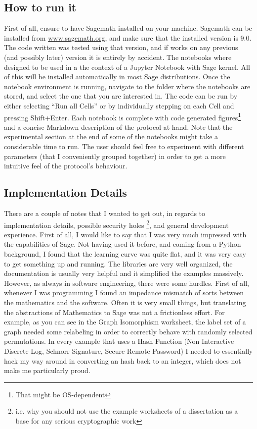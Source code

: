 \documentclass{article}
\begin{document}
\subsection{How to run it}
First of all, ensure to have Sagemath installed on your machine.
Sagemath can be installed from \url{www.sagemath.org}, and make sure that the installed version is 9.0.
The code written was tested using that version, and if works on any previous (and possibly later) version it is entirely
by accident. The notebooks where designed to be used in a the context of a Jupyter Notebook with Sage kernel. All of this
will be installed automatically in most Sage distributions. Once the notebook environment is running, navigate to the
folder where the notebooks are stored, and select the one that you are interested in. The code can be run by either
selecting \enquote{Run all Cells} or by individually stepping on each Cell and pressing Shift+Enter. Each notebook is complete
with code generated figures\footnote{That might be OS-dependent} and a concise Markdown description of the protocol at hand.
Note that the experimental section at the end of some of the notebooks might take a considerable time to run.
The user should feel free to experiment with different parameters (that I conveniently grouped together) in order to
get a more intuitive feel of the protocol's behaviour.

\subsection{Implementation Details}
There are a couple of notes that I wanted to get out, in regards to implementation details, possible security holes
\footnote{i.e. why you should not use the example worksheets of a dissertation as a base for any serious cryptographic
    work}, and general development experience. First of all, I would like to say that I was very much impressed with
the capabilities of Sage. Not having used it before, and coming from a Python background, I found that the learning
curve was quite flat, and it was very easy to get something up and running. The libraries are very well organized,
the documentation is usually very helpful and it simplified the examples massively. However, as always in software
engineering, there were some hurdles. First of all, whenever I was programming I found an impedance mismatch of
sorts between the mathematics and the software. Often it is very small things, but translating the abstractions of
Mathematics to Sage was not a frictionless effort. For example, as you can see in the Graph Isomorphism worksheet,
the label set of a graph needed some relabeling in order to correctly behave with randomly selected permutations.
In every example that uses a Hash Function (Non Interactive Discrete Log, Schnorr Signature, Secure Remote Password)
I needed to essentially hack my way around in converting an hash back to an integer,
which does not make me particularly proud.
\end{document}

